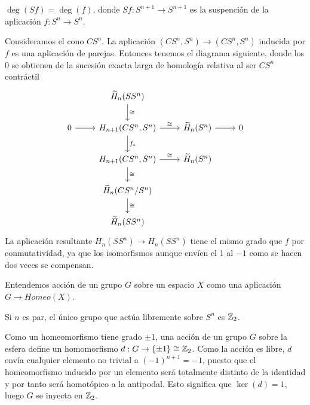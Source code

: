 \documentclass[TA.tex]{subfiles}
\begin{document}
\begin{prop}
$\deg(Sf)=\deg(f)$, donde $Sf:S^{n+1}\to S^{n+1}$ es la suspención de la aplicación $f:S^n\to S^n$. 
\end{prop}
\begin{dem}
Consideramos el cono $CS^n$. La aplicación $(CS^n,S^n)\to (CS^n,S^n)$ inducida por $f$ es una aplicación de parejas. Entonces tenemos el diagrama siguiente, donde los 0 se obtienen de la sucesión exacta larga de homología relativa al ser $CS^n$ contráctil
\[
\begin{tikzcd}
           & \widetilde{H}_n(SS^n)\arrow[d, "\cong"]& &\\
0\arrow[r] & H_{n+1}(CS^n, S^n)\arrow[r, "\cong"]\arrow[d, "f_*"] &\widetilde{H}_n(S^n)\arrow[r] & 0\\
           & H_{n+1}(CS^n, S^n)\arrow[r, "\cong"]\arrow[d, "\cong"] &\widetilde{H}_n(S^n)& \\
           & \widetilde{H}_n(CS^n/S^n)\arrow[d,"\cong"] & & \\
           & \widetilde{H}_n(SS^n)& &
\end{tikzcd}
\]
La aplicación resultante $H_n(SS^n)\to H_n(SS^n)$ tiene el mismo grado que $f$ por conmutatividad, ya que los isomorfismos aunque envíen el 1 al $-1$ como se hacen dos veces se compensan. 
\end{dem}

Entendemos acción de un grupo $G$ sobre un espacio $X$ como una aplicación $G\to Homeo(X)$. 

\begin{prop}
Si $n$ es par, el único grupo que actúa libremente sobre $S^n$ es $\mathbb{Z}_2$. 
\end{prop}
\begin{dem}
Como un homeomorfismo tiene grado $\pm 1$, una acción de un grupo $G$ sobre la esfera define un homomorfismo $d:G\to\{\pm 1\}\cong\mathbb{Z}_2$. Como la acción es libre, $d$ envía cualquier elemento no trivial a $(-1)^{n+1}=-1$, puesto que el homeomorfismo inducido por un elemento será totalmente distinto de la identidad y por tanto será homotópico a la antipodal. Esto significa que $\ker(d)=1$, luego $G$ se inyecta en $\mathbb{Z}_2$. 
\end{dem}
\end{document}
